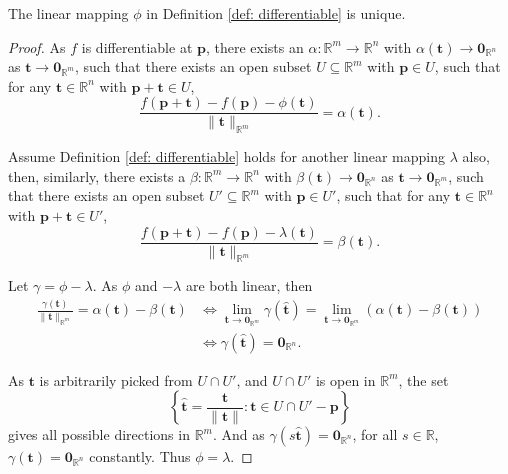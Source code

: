 \begin{lemma}
	\label{lm: differentiable: uniqueness of phi}
	
	The linear mapping $\phi$ in Definition \ref{def: differentiable} is unique.
	
	\begin{proof}
		As $f$ is differentiable at $\mathbf p$, there exists an $\alpha: \mathbb R^m \to \mathbb R^n$ with $\alpha(\mathbf t) \to \mathbf 0_{\mathbb R^n}$ as $\mathbf t \to \mathbf 0_{\mathbb R^m}$, such that there exists an open subset $U \subseteq \mathbb R^m$ with $\mathbf p \in U$, such that for any $\mathbf t \in \mathbb R^n$ with $\mathbf p + \mathbf t \in U$,
			$$
			\frac{f(\mathbf p + \mathbf t) - f(\mathbf p) - \phi(\mathbf t)}{\| \mathbf t \|_{\mathbb R^m}} = \alpha(\mathbf t).
			$$
			
		Assume Definition \ref{def: differentiable} holds for another linear mapping $\lambda$ also, then, similarly, there exists a $\beta: \mathbb R^m \to \mathbb R^n$ with $\beta(\mathbf t) \to \mathbf 0_{\mathbb R^n}$ as $\mathbf t \to \mathbf 0_{\mathbb R^m}$, such that there exists an open subset $U' \subseteq \mathbb R^m$ with $\mathbf p \in U'$, such that for any $\mathbf t \in \mathbb R^n$ with $\mathbf p + \mathbf t \in U'$,
		$$
		\frac{f(\mathbf p + \mathbf t) - f(\mathbf p) - \lambda(\mathbf t)}{\| \mathbf t \|_{\mathbb R^m}} = \beta(\mathbf t).
		$$
		
		Let $\gamma = \phi - \lambda$. As $\phi$ and $-\lambda$ are both linear, then
		$$
		\begin{aligned}
			\frac{\gamma(\mathbf t)}{\| \mathbf t \|_{\mathbb R^m}} = \alpha(\mathbf t) - \beta(\mathbf t) &\iff \lim_{\mathbf t \to \mathbf 0_{\mathbb R^m}} \gamma(\mathbf{\hat t}) = \lim_{\mathbf t \to \mathbf 0_{\mathbb R^m}} (\alpha(\mathbf t) - \beta(\mathbf t)) \\
			&\iff \gamma(\mathbf{\hat t}) = \mathbf 0_{\mathbb R^n}.
		\end{aligned}
		$$
		
		As $\mathbf t$ is arbitrarily picked from $U \cap U'$, and $U \cap U'$ is open in $\mathbb R^m$, the set
		$$
		\left\{ \mathbf{\hat t} = \frac{\mathbf t}{\| \mathbf t \|} : \mathbf t \in U \cap U' - \mathbf p \right\}
		$$
		gives all possible directions in $\mathbb R^m$. And as $\gamma(s\mathbf{\hat t}) = \mathbf 0_{\mathbb R^n}$, for all $s \in \mathbb R$, $\gamma(\mathbf t) = \mathbf 0_{\mathbb R^n}$ constantly. Thus $\phi = \lambda$.
	\end{proof}
\end{lemma}


